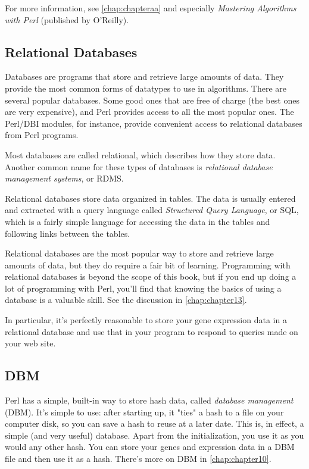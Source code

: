 For more information, see \autoref{chap:chapteraa} and especially \textit{Mastering Algorithms with Perl} (published by O'Reilly). 

\subsection{Relational Databases}
Databases are programs that store and retrieve large amounts of data.  They provide the most common forms of datatypes to use in algorithms.  There are several popular databases. Some good ones that are free of charge (the best ones are very expensive), and Perl provides access to all the most popular ones. The Perl/DBI modules, for instance, provide convenient access to relational databases from Perl programs.

Most databases are called relational, which describes how they store data. Another common name for these types of databases is \textit{relational database management systems}, or RDMS. 

Relational databases store data organized in tables. The data is usually entered and extracted with a query language called \textit{Structured Query Language}, or SQL, which is a fairly simple language for accessing the data in the tables and following links between the tables.

Relational databases are the most popular way to store and retrieve large amounts of data, but they do require a fair bit of learning.  Programming with relational databases is beyond the scope of this book, but if you end up doing a lot of programming with Perl, you'll find that knowing the basics of using a database is a valuable skill. See the discussion in \autoref{chap:chapter13}.

In particular, it's perfectly reasonable to store your gene expression data in a relational database and use that in your program to respond to queries made on your web site. 

\subsection{DBM}
Perl has a simple, built-in way to store hash data, called \textit{database management} (DBM). It's simple to use: after starting up, it "ties" a hash to a file on your computer disk, so you can save a hash to reuse at a later date. This is, in effect, a simple (and very useful) database.  Apart from the initialization, you use it as you would any other hash.  You can store your genes and expression data in a DBM file and then use it as a hash. There's more on DBM in \autoref{chap:chapter10}.

